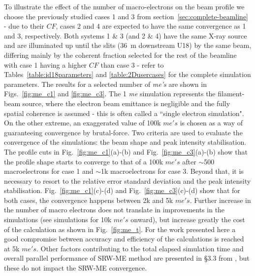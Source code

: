\documentclass{iucr}              %
\begin{document}
To illustrate the effect of the number of macro-electrons on the beam profile we choose the previously studied cases 1 and 3 from section~\ref{sec:complete-beamline} - due to their $CF$, cases 2 and 4 are expected to have the same convergence as 1 and 3, respectively. Both systems 1 \& 3 (and 2 \& 4) have the same X-ray source and are illuminated up until the slits (36~m downstream U18) by the same beam, differing mainly by the coherent fraction selected for the rest of the beamline with case 1 having a higher $CF$ than case 3 - refer to Tables~\ref{table:id18parameters} and \ref{table:2Dusercases} for the complete simulation parameters. The results for a selected number of \textit{me's} are shown in Figs.~\ref{fig:me_c1} and \ref{fig:me_c3}. The 1 \textit{me} simulation represents the filament-beam source, where the electron beam emittance is negligible and the fully spatial coherence is assumed - this is often called a ``single electron simulation". On the other extreme, an exaggerated value of 100k $me's$ is chosen as a way of guaranteeing convergence by brutal-force. Two criteria are used to evaluate the convergence of the simulations: the beam shape and peak intensity stabilisation. The profile cuts in  Fig.~\ref{fig:me_c1}(a)-(b) and Fig.~\ref{fig:me_c3}(a)-(b) show that the profile shape starts to converge to that of a 100k $me's$ after $\sim$500 macroelectrons for case 1 and $\sim$1k macroelectrons for case 3. Beyond that, it is necessary to resort to the relative error standard deviation and the peak intensity stabilisation. Fig.~\ref{fig:me_c1}(c)-(d) and Fig.~\ref{fig:me_c3}(c)-(d) show that for both cases, the convergence happens between 2k and 5k $me's$. Further increase in the number of macro electrons does not translate in improvements in the simulations (see simulations for 10k $me's$ onward), but increase greatly the cost of the calculation as shown in Fig.~\ref{fig:me_t}. For the work presented here a good compromise between accuracy and efficiency of the calculations is reached at 5k $me's$. Other factors contributing to the total elapsed simulation time and overall parallel performance of SRW-ME method are presented in \S3.3 from \cite{codeSRW_MEscan}, but these do not impact the SRW-ME convergence.
\end{document}
